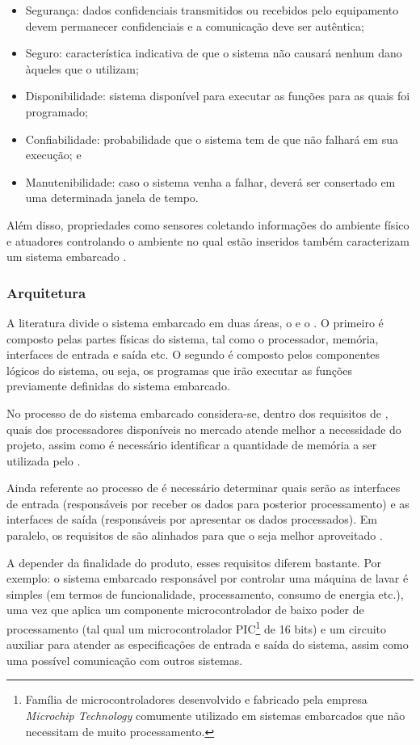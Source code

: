 \begin{itemize}
  \item Segurança: dados confidenciais transmitidos ou recebidos pelo
  equipamento devem permanecer confidenciais e a comunicação deve ser autêntica;
  \item Seguro: característica indicativa de que o sistema não causará nenhum dano àqueles que o utilizam;
  \item Disponibilidade: sistema disponível para executar as funções para as quais
  foi programado; 
  \item Confiabilidade: probabilidade que o sistema tem de que não
  falhará em sua execução; e
  \item Manutenibilidade: caso o sistema venha a falhar, deverá 
  ser consertado em uma determinada janela de tempo.
\end{itemize}

Além disso, propriedades como sensores coletando informações do ambiente
físico e atuadores controlando o ambiente no qual estão inseridos também
caracterizam um sistema embarcado \cite{marwedel2010embedded}.

\subsubsection{Arquitetura}\label{subsubsec:arquitetura}

A literatura divide o sistema embarcado em duas áreas, o \hardware[] e o 
\software. O primeiro é composto pelas partes físicas do sistema, 
tal como o processador, memória, interfaces de entrada e saída etc. O segundo é
composto pelos componentes lógicos do sistema, ou seja, os programas que 
irão executar as funções previamente definidas do sistema embarcado.

No processo de \design[] do sistema embarcado considera-se, dentro dos
requisitos de \hardware, quais dos processadores disponíveis no mercado atende
melhor a necessidade do projeto, assim como é necessário identificar a
quantidade de memória a ser utilizada pelo \software[]. 

Ainda referente ao processo de \design[] é necessário determinar quais serão as
interfaces de entrada (responsáveis por receber os dados para posterior
processamento) e as interfaces de saída (responsáveis por apresentar os dados
processados). Em paralelo, os requisitos de \software[] são alinhados para que o
\hardware[] seja melhor aproveitado \cite{wolf2012computers}.

A depender da finalidade do produto, esses requisitos diferem bastante. Por
exemplo: o sistema embarcado responsável por controlar uma máquina de lavar é
simples (em termos de funcionalidade, processamento, consumo de energia etc.),
uma vez que aplica um componente microcontrolador de baixo poder de
processamento (tal qual um microcontrolador PIC\footnote{Família de
microcontroladores desenvolvido e fabricado pela empresa \textit{Microchip
Technology} comumente utilizado em sistemas embarcados que não necessitam de
muito processamento.} de 16 bits) e um circuito auxiliar para atender as
especificações de entrada e saída do sistema, assim como uma possível
comunicação com outros sistemas.

